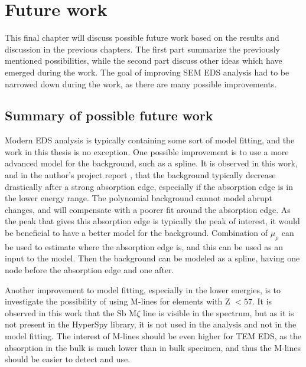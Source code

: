 \chapter{Future work}
\label{ch:future_work}


This final chapter will discuss possible future work based on the results and discussion in the previous chapters.
The first part summarize the previously mentioned possibilities, while the second part discuss other ideas which have emerged during the work.
The goal of improving SEM EDS analysis had to be narrowed down during the work, as there are many possible improvements.


\section{Summary of possible future work}
\label{sec:summary_of_possible_future_work}

Modern EDS analysis is typically containing some sort of model fitting, and the work in this thesis is no exception.
One possible improvement is to use a more advanced model for the background, such as a spline.
It is observed in this work, and in the author's project report \cite{project_report}, that the background typically decrease drastically after a strong absorption edge, especially if the absorption edge is in the lower energy range.
The polynomial background cannot model abrupt changes, and will compensate with a poorer fit around the absorption edge.
As the peak that gives this absorption edge is typically the peak of interest, it would be beneficial to have a better model for the background.
Combination of $\mu_\rho$ can be used to estimate where the absorption edge is, and this can be used as an input to the model.
Then the background can be modeled as a spline, having one node before the absorption edge and one after.

Another improvement to model fitting, especially in the lower energies, is to investigate the possibility of using M-lines for elements with Z $ < 57$.
It is observed in this work that the Sb M$\zeta$ line is visible in the spectrum, but as it is not present in the HyperSpy library, it is not used in the analysis and not in the model fitting.
The interest of M-lines should be even higher for TEM EDS, as the absorption in the bulk is much lower than in bulk specimen, and thus the M-lines should be easier to detect and use.

